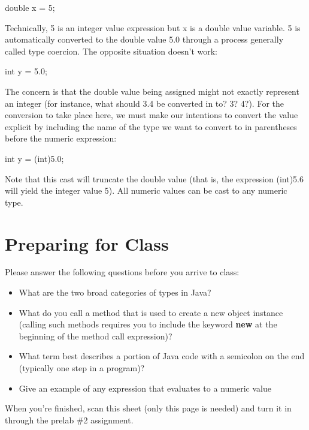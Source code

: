 \begin{code}
double x = 5;
\end{code}

Technically, 5 is an integer value expression but x is a double value variable. 5 is automatically converted to the double value 5.0 through a process generally called type coercion. The opposite situation doesn't work:

\begin{code}
int y = 5.0;
\end{code}

The concern is that the double value being assigned might not exactly represent an integer (for instance, what should 3.4 be converted in to? 3? 4?). For the conversion to take place here, we must make our intentions to convert the value explicit by including the name of the type we want to convert to in parentheses before the numeric expression:

\begin{code}
int y = (int)5.0;
\end{code}

Note that this cast will truncate the double value (that is, the expression (int)5.6 will yield the integer value 5). All numeric values can be cast to any numeric type. 
\newpage

\section{Preparing for Class}

Please answer the following questions before you arrive to class:

\begin{exer}

\begin{itemize}
\item What are the two broad categories of types in Java?

  \evalline
  
\item What do you call a method that is used to create a new object instance (calling such methods requires you to include the keyword \textbf{new} at the beginning of the method call expression)?

  \evalline
  
\item What term best describes a portion of Java code with a semicolon on the end (typically one step in a program)?

  \evalline
  
\item Give an example of any expression that evaluates to a numeric value

  \evalline
  
  
\end{itemize}

\end{exer}

When you're finished, scan this sheet (only this page is needed) and turn it in through the prelab \#2 assignment. 


